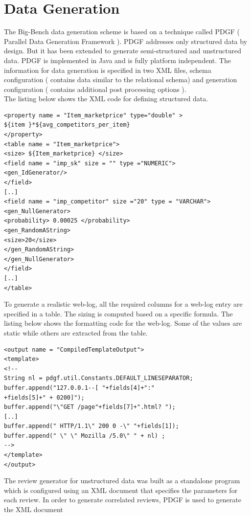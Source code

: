 \documentclass[12pt]{book}
\begin{document}
\section{Data Generation}
The Big-Bench data generation scheme is based on a technique called PDGF ( Parallel Data Generation Framework ). PDGF addresses only structured
data by design. But it has been extended to generate semi-structured and unstructured data. PDGF is implemented in Java and is fully
platform independent. The information for data generation is specified in two XML files, schema configuration ( contains data similar
to the relational schema) and generation configuration ( contains additional post processing options ).
\\\noindent
\cite{ghazal} The listing below shows the XML code for defining structured data.
\lstset{language=XML,basicstyle=\ttfamily,showspaces=false, showstringspaces=false}
\begin{lstlisting}[frame=single]
<property name = "Item_marketprice" type="double" >
${item }*${avg_competitors_per_item}
</property>
<table name = "Item_marketprice">
<size> ${Item_marketprice} </size>
<field name = "imp_sk" size = "" type ="NUMERIC">
<gen_IdGenerator/>
</field>
[..]
<field name = "imp_competitor" size ="20" type = "VARCHAR">
<gen_NullGenerator>
<probability> 0.00025 </probability>
<gen_RandomAString>
<size>20</size>
</gen_RandomAString>
</gen_NullGenerator>
</field>
[..]
</table>
\end{lstlisting}
\noindent
To generate a realistic web-log, all the required  columns for a web-log entry are specified in a table.
The sizing is computed based on a specific formula. The listing below shows the formatting code for the web-log.
Some of the values are static while others are extracted from the table.
\\\noindent
\begin{lstlisting}[frame=single]
<output name = "CompiledTemplateOutput">
<template> 
<!--
String nl = pdgf.util.Constants.DEFAULT_LINESEPARATOR;
buffer.append("127.0.0.1--[ "+fields[4]+":"
+fields[5]+" + 0200]");
buffer.append("\"GET /page"+fields[7]+".html? ");
[..]
buffer.append(" HTTP/1.1\" 200 0 -\" "+fields[1]);
buffer.append(" \" \" Mozilla /5.0\" " + nl) ;
-->
</template>
</output>
\end{lstlisting}
\noindent
The review generator for unstructured data was built as a standalone program which is configured using an XML document that 
specifies the parameters for each review. In order to generate correlated reviews, PDGF is used to generate the XML document
\end{document}
